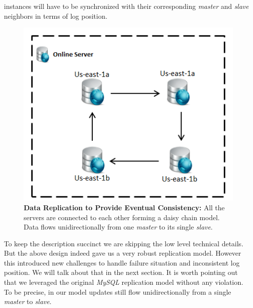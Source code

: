 \documentclass[12pt]{article}
\begin{document}
instances will have to be synchronized with their corresponding \emph{master}
and \emph{slave} neighbors in terms of log position.  
\begin{figure}[H]
\centering 
\includegraphics[scale=0.8]{Images/figure2.PNG} 
\caption{\textbf{Data Replication to Provide Eventual Consistency: }All the servers are connected to
each other forming a daisy chain model. Data flows unidirectionally from one
\emph{master} to its single 
\emph{slave}. } 
\label{fig:connectreplication}
\end{figure} To keep the description succinct we are skipping the low level
technical details. But the above design indeed gave us a very robust replication
model. However this introduced new challenges to handle failure situation and
inconsistent log position. We will talk about that in the next section. It is
worth pointing out that we leveraged the original \emph{MySQL} replication model
without any violation. To be precise, in our model updates still flow
unidirectionally from a single \emph{master} to \emph{slave}.
\end{document}
